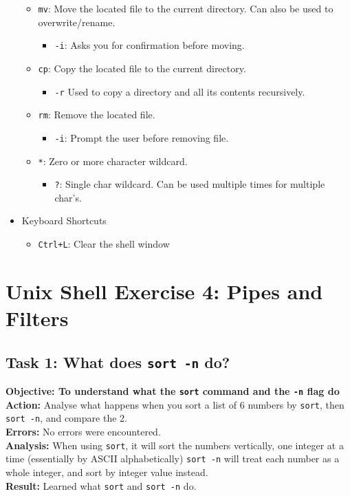 \documentclass{article}
\begin{document}
\begin{itemize}
\begin{itemize}
        \item \verb|mv|: Move the located file to the current directory. Can also be used to overwrite/rename.
        \begin{itemize}
            \item \verb|-i|: Asks you for confirmation before moving.
        \end{itemize}
        \item \verb|cp|: Copy the located file to the current directory.
        \begin{itemize}
            \item \verb|-r| Used to copy a directory and all its contents recursively.
        \end{itemize}
        \item \verb|rm|: Remove the located file.
        \begin{itemize}
            \item \verb|-i|: Prompt the user before removing file.
        \end{itemize}
        \item \verb|*|: Zero or more character wildcard.
        \begin{itemize}
            \item \verb|?|: Single char wildcard. Can be used multiple times for multiple char's.
        \end{itemize}
    \end{itemize}
    \item Keyboard Shortcuts
    \begin{itemize}
        \item \verb|Ctrl+L|: Clear the shell window
    \end{itemize}
\end{itemize}
\newpage
\section{Unix Shell Exercise 4: Pipes and Filters}
\subsection{Task 1: What does \texttt{sort -n} do?}
\textbf{Objective: To understand what the \texttt{sort} command and the \texttt{-n} flag do}\\
\textbf{Action:} Analyse what happens when you sort a list of 6 numbers by \texttt{sort}, then \texttt{sort -n}, and compare the 2.\\
\textbf{Errors:} No errors were encountered.\\
\textbf{Analysis:} When using \texttt{sort}, it will sort the numbers vertically, one integer at a time (essentially by ASCII alphabetically) \texttt{sort -n} will treat each number as a whole integer, and sort by integer value instead.\\
\textbf{Result:} Learned what \texttt{sort} and \texttt{sort -n} do.
%
\end{document}
